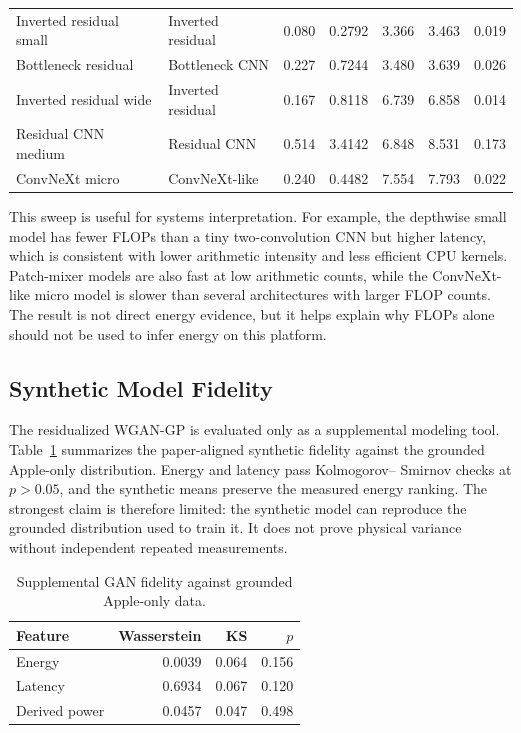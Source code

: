\documentclass[conference]{IEEEtran}
\begin{document}
\begin{table}[t]
\begin{tabular}{llrrrrr}
Inverted residual small & Inverted residual & 0.080 & 0.2792 & 3.366 & 3.463 & 0.019\\
Bottleneck residual & Bottleneck CNN & 0.227 & 0.7244 & 3.480 & 3.639 & 0.026\\
Inverted residual wide & Inverted residual & 0.167 & 0.8118 & 6.739 & 6.858 & 0.014\\
Residual CNN medium & Residual CNN & 0.514 & 3.4142 & 6.848 & 8.531 & 0.173\\
ConvNeXt micro & ConvNeXt-like & 0.240 & 0.4482 & 7.554 & 7.793 & 0.022\\
\bottomrule
\end{tabular}
\end{table}

This sweep is useful for systems interpretation. For example, the depthwise
small model has fewer FLOPs than a tiny two-convolution CNN but higher latency,
which is consistent with lower arithmetic intensity and less efficient CPU
kernels. Patch-mixer models are also fast at low arithmetic counts, while the
ConvNeXt-like micro model is slower than several architectures with larger
FLOP counts. The result is not direct energy evidence, but it helps explain why
FLOPs alone should not be used to infer energy on this platform.

\subsection{Synthetic Model Fidelity}

The residualized WGAN-GP is evaluated only as a supplemental modeling tool.
Table~\ref{tab:gan} summarizes the paper-aligned synthetic fidelity against
the grounded Apple-only distribution. Energy and latency pass Kolmogorov--
Smirnov checks at $p>0.05$, and the synthetic means preserve the measured
energy ranking. The strongest claim is therefore limited: the synthetic model
can reproduce the grounded distribution used to train it. It does not prove
physical variance without independent repeated measurements.

\begin{table}[t]
\centering
\caption{Supplemental GAN fidelity against grounded Apple-only data.}
\label{tab:gan}
\small
\begin{tabular}{lrrr}
\toprule
Feature & Wasserstein & KS & $p$\\
\midrule
Energy & 0.0039 & 0.064 & 0.156\\
Latency & 0.6934 & 0.067 & 0.120\\
Derived power & 0.0457 & 0.047 & 0.498\\
\bottomrule
\end{tabular}
\end{table}
\end{document}
